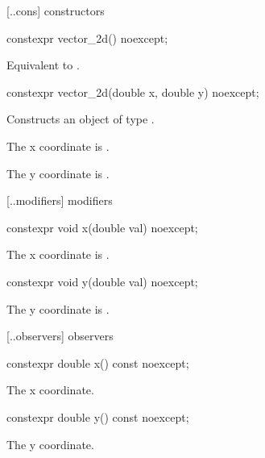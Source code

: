  [\iotwod.\vectortwod.cons] { constructors}

%
\begin{itemdecl}
constexpr vector_2d() noexcept;
\end{itemdecl}
\begin{itemdescr}
\pnum
\effects
Equivalent to .
\end{itemdescr}

%
\begin{itemdecl}
constexpr vector_2d(double x, double y) noexcept;
\end{itemdecl}
\begin{itemdescr}
\pnum
\effects
Constructs an object of type .

\pnum
The x coordinate is .

\pnum
The y coordinate is .
\end{itemdescr}

 [\iotwod.\vectortwod.modifiers]{ modifiers}

%
\begin{itemdecl}
constexpr void x(double val) noexcept;
\end{itemdecl}
\begin{itemdescr}
\pnum
\effects
The x coordinate is .
\end{itemdescr}

%
\begin{itemdecl}
constexpr void y(double val) noexcept;
\end{itemdecl}
\begin{itemdescr}
\pnum
\effects
The y coordinate is .
\end{itemdescr}

 [\iotwod.\vectortwod.observers]{ observers}

%
\begin{itemdecl}
constexpr double x() const noexcept;
\end{itemdecl}
\begin{itemdescr}
\pnum
\returns
The x coordinate.
\end{itemdescr}

%
\begin{itemdecl}
constexpr double y() const noexcept;
\end{itemdecl}
\begin{itemdescr}
\pnum
\returns
The y coordinate.
\end{itemdescr}

